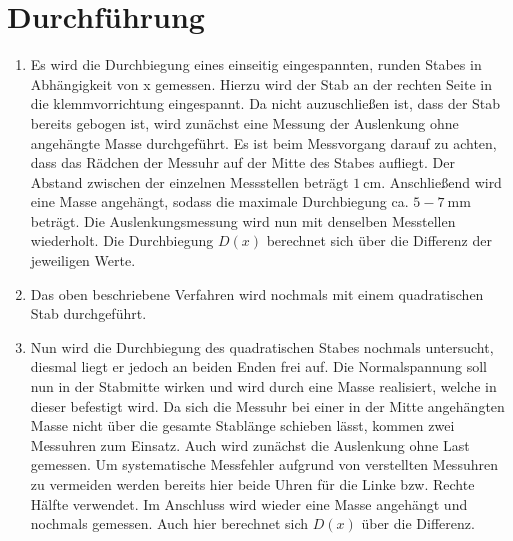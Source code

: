 
\section{Durchführung}
\label{sec:Durchführung}

\renewcommand{\labelenumi}{\alph{enumi})}
\begin{enumerate}
  \item Es wird die Durchbiegung eines einseitig eingespannten, runden Stabes in
   Abhängigkeit von x gemessen. Hierzu wird der Stab an der rechten Seite in die klemmvorrichtung eingespannt.
   Da nicht auzuschließen ist, dass der Stab bereits gebogen ist, wird zunächst
    eine Messung der Auslenkung ohne angehängte Masse durchgeführt. Es ist beim
     Messvorgang darauf zu achten, dass das Rädchen der Messuhr auf der Mitte des Stabes aufliegt.
     Der Abstand zwischen der einzelnen Messstellen beträgt
     $\SI{1}{\centi\meter}$. Anschließend wird eine Masse angehängt, sodass
      die maximale Durchbiegung ca. $5-\SI{7}{\milli\meter}$ beträgt. Die Auslenkungsmessung
       wird nun mit denselben Messtellen wiederholt. Die Durchbiegung $D(x)$
       berechnet sich über die Differenz der jeweiligen Werte.

       \item Das oben beschriebene Verfahren wird nochmals mit einem
        quadratischen Stab durchgeführt.

        \item Nun wird die Durchbiegung des quadratischen Stabes nochmals untersucht, diesmal liegt er jedoch an beiden Enden frei auf.
         Die Normalspannung soll nun in der Stabmitte wirken und wird durch eine
          Masse realisiert, welche in dieser befestigt wird.
          Da sich die Messuhr bei einer in der Mitte angehängten Masse nicht
           über die gesamte Stablänge schieben lässt, kommen zwei Messuhren zum Einsatz.
           Auch wird zunächst die Auslenkung ohne Last gemessen.
            Um systematische Messfehler aufgrund von verstellten Messuhren zu vermeiden werden bereits hier
             beide Uhren für die Linke bzw. Rechte Hälfte verwendet. Im Anschluss
              wird wieder eine Masse angehängt und nochmals gemessen. Auch hier
               berechnet sich $D(x)$ über die Differenz.

\end{enumerate}
